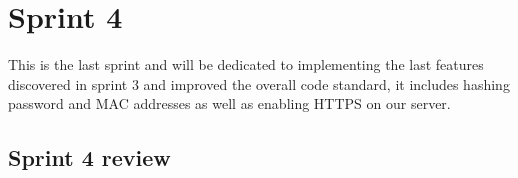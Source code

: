 \chapter{Sprint 4}
This is the last sprint and will be dedicated to implementing the last features discovered in sprint 3 and improved the overall code standard, it includes hashing password and MAC addresses as well as enabling HTTPS on our server. %






\section{Sprint 4 review}